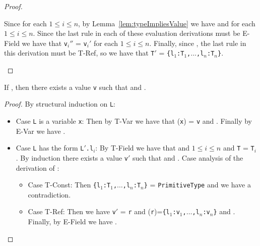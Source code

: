 \begin{proof}
\begin{itemize}
Since  for each $1
  \leq i \leq n$,  by Lemma~\ref{lem:typeImpliesValue} 
we have 
    and
   for each $1 \leq i \leq n$.
  Since the last rule in each of these evaluation derivations must be
  {\sc E-Field} we have that {\tt v$_i''$} = {\tt v$_i'$} for each $1
  \leq i \leq n$.
  Finally, since ,  the last rule in
  this derivation must be {\sc T-Ref}, so we
  have that {\tt T$'$} = {\tt  \{l$_1$:T$_1$,$\ldots$,l$_n$:T$_n$\}}.

 \end{itemize}
\end{proof}

\begin{Lemma}
\label{lem:typeImpliesValue}
If \emph{}, then there exists a value {\tt v}
such that \emph{} and \emph{}.
\end{Lemma}
\begin{proof}
By structural induction on {\tt L}:
\begin{itemize}
\item Case {\tt L} is a variable {\tt x}:  Then by {\sc T-Var} we have
that \texttt{\Euid}(\texttt{x}) = \texttt{v} and
.  Finally by {\sc E-Var} we
have .

\item Case {\tt L} has the form {\tt L$'$.l$_i$}:  By {\sc T-Field} we
  have that 
  and $1 \leq i \leq n$ and {\tt T} = {\tt T$_i$}.  By induction there
  exists a value {\tt v$'$} such that 
  and .
  Case analysis of the derivation of
  :
  \begin{itemize}
    \item Case {\sc T-Const}:  Then {\tt \{l$_1$:T$_1$,$\ldots$,l$_n$:T$_n$\}} = {\tt PrimitiveType}
      and we have a contradiction.
    \item Case {\sc T-Ref}:  Then we have {\tt v$'$} = {\tt r} and 
  \texttt{\Huid}(\texttt{r})=\texttt{\{l$_1$:v$_1$,$\ldots$,l$_n$:v$_n$\}}
    and
  .  Finally, by {\sc E-Field}
  we have .
   \end{itemize}
\end{itemize}
\end{proof}

